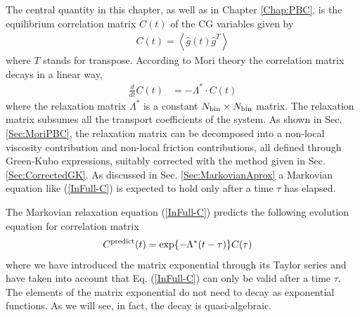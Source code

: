 \documentclass[a4paper,openright,12pt]{book}
\newcommand{\esc}{\!\cdot\!}
\newcommand{\llangle}{\left\langle}
\newcommand{\rrangle}{\right\rangle}
\begin{document}
The central quantity in this chapter, as well as in Chapter \ref{Chap:PBC}, is the equilibrium correlation matrix $C(t)$ of the CG variables given by
\begin{align}
  C(t)=\llangle \hat{g}(t) \hat{g}^T\rrangle
\end{align}
where  $T$  stands  for  transpose.   According  to  Mori  theory  the
correlation matrix decays in a linear way,
\begin{align}
 \frac{d}{dt}C(t)&= -\Lambda^*\esc C(t)
\label{InFull-C}
\end{align}
where  the  relaxation  matrix   $\Lambda^*$  is  a  constant  $N_{\rm
  bin}\times N_{\rm  bin}$ matrix. The relaxation  matrix subsumes all
  the transport coefficients  of the system. As shown  in Sec. \ref{Sec:MoriPBC},
the relaxation  matrix can  be decomposed  into a  non-local viscosity
contribution and non-local friction contributions, all defined through
Green-Kubo expressions,  suitably corrected  with the method  given in
Sec. \ref{Sec:CorrectedGK}.  As discussed in  Sec.  \ref{Sec:MarkovianAprox} a  Markovian equation
like (\ref{InFull-C}) is expected to hold only after a time $\tau$ has
elapsed. 

The Markovian relaxation equation (\ref{InFull-C}) predicts the following
evolution equation for correlation matrix
\begin{align}
  C^{\rm predict}(t)&=\exp\{-\Lambda^* (t-\tau)\}C(\tau)
\label{Cpredict}
\end{align}
where we  have introduced  the matrix  exponential through  its Taylor
series and have taken into account that Eq.  (\ref{InFull-C}) can only
be valid after  a time $\tau$. The elements of  the matrix exponential
do not  need to  decay as  exponential functions. As  we will  see, in
fact,  the decay  is  quasi-algebraic.   
\end{document}
